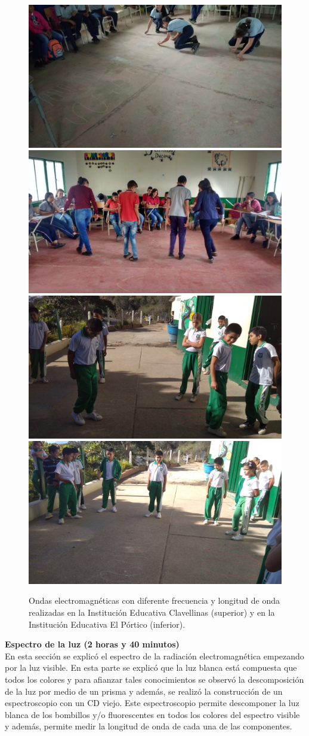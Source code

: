 \documentclass[a4paper,10pt]{article}
\begin{document}
\begin{figure}[H]
    \centering
    \includegraphics[width = 8.3 cm]{Imagenes/ondas1clave.jpg}
    \includegraphics[width = 8.4 cm]{Imagenes/luz3.jpeg}
     \includegraphics[width = 8.3 cm]{Imagenes/onda2portico.jpg}
     \includegraphics[width = 8.3 cm]{Imagenes/porticoonda.jpg}
    \caption{Ondas electromagnéticas con diferente frecuencia y longitud de onda realizadas en la Institución Educativa Clavellinas (superior) y en la Institución Educativa El Pórtico (inferior).}
\end{figure}

\noindent \textbf{Espectro de la luz (2 horas y 40 minutos)}\\
En esta sección se explicó el espectro de la radiación electromagnética empezando por la luz visible. En esta parte se explicó que la luz blanca está compuesta que todos los colores y para afianzar tales conocimientos se observó la descomposición de la luz por medio de un prisma y además, se realizó la construcción de un espectroscopio con un CD viejo. Este espectroscopio permite descomponer la luz blanca de los bombillos y/o fluorescentes en todos los colores del espectro visible y además, permite medir la longitud de onda de cada una de las componentes.
\end{document}
